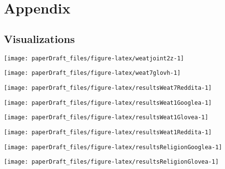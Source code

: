 \documentclass[
  12pt,
  dvipsnames,enabledeprecatedfontcommands]{scrartcl}
\begin{document}
\newpage
\appendix

\hypertarget{appendix}{%
\section{Appendix}\label{appendix}}

\label{sec:appendix}

\hypertarget{visualizations}{%
\subsection{Visualizations}\label{visualizations}}

\label{appendix:visualizations}

\begin{center}\texttt{[image: paperDraft\_files/figure-latex/weatjoint2z-1]} \end{center}

\pagebreak

\begin{center}\texttt{[image: paperDraft\_files/figure-latex/weat7glovh-1]} \end{center}

\begin{center}\texttt{[image: paperDraft\_files/figure-latex/resultsWeat7Reddita-1]} \end{center}

\begin{center}\texttt{[image: paperDraft\_files/figure-latex/resultsWeat1Googlea-1]} \end{center}

\begin{center}\texttt{[image: paperDraft\_files/figure-latex/resultsWeat1Glovea-1]} \end{center}

\begin{center}\texttt{[image: paperDraft\_files/figure-latex/resultsWeat1Reddita-1]} \end{center}

\begin{center}\texttt{[image: paperDraft\_files/figure-latex/resultsReligionGooglea-1]} \end{center}

\begin{center}\texttt{[image: paperDraft\_files/figure-latex/resultsReligionGlovea-1]} \end{center}
\end{document}
